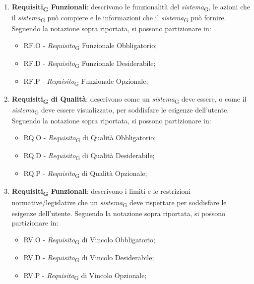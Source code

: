 \begin{enumerate}
    \item \textbf{Requisiti\textsubscript{G} Funzionali}: descrivono le funzionalità del \textit{sistema}\textsubscript{G}, le azioni che il \textit{sistema}\textsubscript{G} può compiere e le informazioni che il \textit{sistema}\textsubscript{G} può fornire. Seguendo la notazione sopra riportata, si possono partizionare in:
    \begin{itemize}
        \item RF.O - \textit{Requisito}\textsubscript{G} Funzionale Obbligatorio;
        \item RF.D - \textit{Requisito}\textsubscript{G} Funzionale Desiderabile;
        \item RF.P - \textit{Requisito}\textsubscript{G} Funzionale Opzionale;
    \end{itemize}
     \item \textbf{Requisiti\textsubscript{G} di Qualità}: descrivono come un \textit{sistema}\textsubscript{G} deve essere, o come il \textit{sistema}\textsubscript{G} deve essere visualizzato, per soddisfare le esigenze dell’utente. Seguendo la notazione sopra riportata, si possono partizionare in:
    \begin{itemize}
        \item RQ.O - \textit{Requisito}\textsubscript{G} di Qualità Obbligatorio;
        \item RQ.D - \textit{Requisito}\textsubscript{G} di Qualità Desiderabile;
        \item RQ.P - \textit{Requisito}\textsubscript{G} di Qualità Opzionale;
    \end{itemize}
     \item \textbf{Requisiti\textsubscript{G} Funzionali}: descrivono i limiti e le restrizioni normative/legislative che un \textit{sistema}\textsubscript{G} deve rispettare per soddisfare le esigenze dell’utente. Seguendo la notazione sopra riportata, si possono partizionare in:
    \begin{itemize}
        \item RV.O - \textit{Requisito}\textsubscript{G} di Vincolo Obbligatorio;
        \item RV.D - \textit{Requisito}\textsubscript{G} di Vincolo Desiderabile;
        \item RV.P - \textit{Requisito}\textsubscript{G} di Vincolo Opzionale;
    \end{itemize}
\end{enumerate}